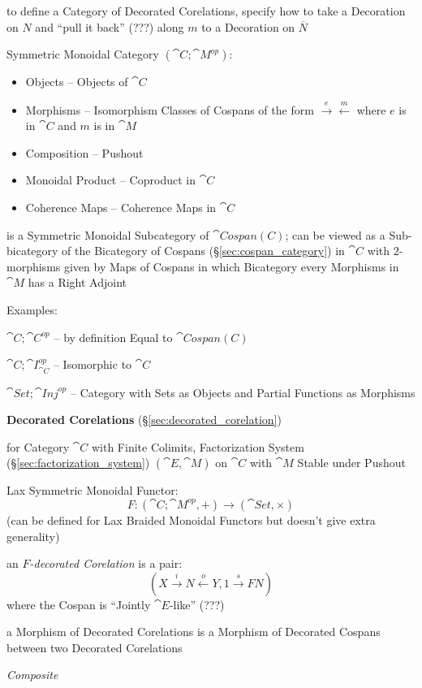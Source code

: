 to define a Category of Decorated Corelations, specify how to take a
Decoration on $N$ and ``pull it back'' (???) along $m$ to a Decoration
on $\overline{N}$

Symmetric Monoidal Category $(\cat{C}; \cat{M}^{op})$:
\begin{itemize}
  \item Objects -- Objects of $\cat{C}$
  \item Morphisms -- Isomorphism Classes of Cospans of the form
    $\xrightarrow{e}\xleftarrow{m}$ where $e$ is in $\cat{C}$ and $m$
    is in $\cat{M}$
  \item Composition -- Pushout
  \item Monoidal Product -- Coproduct in $\cat{C}$
  \item Coherence Maps -- Coherence Maps in $\cat{C}$
\end{itemize}
is a Symmetric Monoidal Subcategory of $\cat{Cospan(C)}$; can be
viewed as a Sub-bicategory of the Bicategory of Cospans
(\S\ref{sec:cospan_category}) in $\cat{C}$ with $2$-morphisms given by
Maps of Cospans in which Bicategory every Morphisms in $\cat{M}$ has a
Right Adjoint


Examples:

$\cat{C};\cat{C}^{op}$ -- by definition Equal to $\cat{Cospan(C)}$

$\cat{C};\cat{I}_{\cat{C}}^{op}$ -- Isomorphic to $\cat{C}$

$\cat{Set};\cat{Inj}^{op}$ -- Category with Sets as Objects and
Partial Functions as Morphisms


\textbf{Decorated Corelations} (\S\ref{sec:decorated_corelation})

for Category $\cat{C}$ with Finite Colimits, Factorization System
(\S\ref{sec:factorization_system}) $(\cat{E},\cat{M})$ on $\cat{C}$
with $\cat{M}$ Stable under Pushout

Lax Symmetric Monoidal Functor:
\[
  F : (\cat{C};\cat{M}^{op}, +) \rightarrow (\cat{Set}, \times)
\]
(can be defined for Lax Braided Monoidal Functors but doesn't give
extra generality)

an \emph{$F$-decorated Corelation} is a pair:
\[
  (X \xrightarrow{i} N \xleftarrow{o} Y, 1 \xrightarrow{s} F N)
\]
where the Cospan is ``Jointly $\cat{E}$-like'' (???) %

a Morphism of Decorated Corelations is a Morphism of Decorated Cospans
between two Decorated Corelations


\emph{Composite} %


